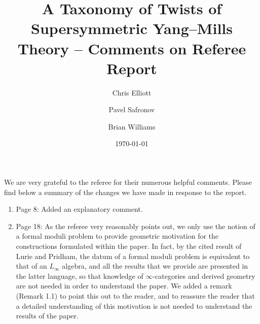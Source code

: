 \documentclass[10pt, oneside]{article}
\title{A Taxonomy of Twists of Supersymmetric Yang--Mills Theory -- Comments on Referee Report}
\author{Chris Elliott\and Pavel Safronov \and Brian Williams}
\date{\today}
\begin{document}
\maketitle

We are very grateful to the referee for their numerous helpful comments.  Please find below a summary of the changes we have made in response to the report.

\begin{enumerate}
 \item Page 8: Added an explanatory comment.
 \item Page 18: As the referee very reasonably points out, we only use the notion of a formal moduli problem to provide geometric motivation for the constructions formulated within the paper.  In fact, by the cited result of Lurie and Pridham, the datum of a formal moduli problem is equivalent to that of an $L_\infty$ algebra, and all the results that we provide are presented in the latter language, so that knowledge of $\infty$-categories and derived geometry are not needed in order to understand the paper.  We added a remark (Remark 1.1) to point this out to the reader, and to reassure the reader that a detailed understanding of this motivation is not needed to understand the results of the paper.


\end{enumerate}
\end{document}
